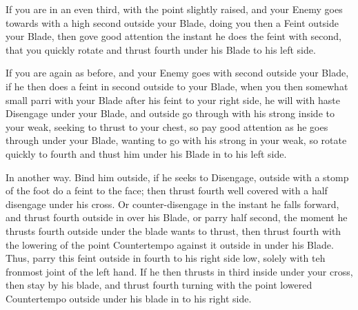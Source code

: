 If you are in an even third, with the point slightly raised, and your
Enemy goes towards with a high second outside your Blade, doing you
then a Feint outside your Blade, then gove good attention the instant
he does the feint with second, that you quickly rotate and thrust
fourth under his Blade to his left side.

\exercise{}

If you are again as before, and your Enemy goes with second outside
your Blade, if he then does a feint in second outside to your Blade,
when you then somewhat small parri with your Blade after his feint to
your right side, he will with haste Disengage under your Blade, and
outside go through with his strong inside to your weak, seeking to
thrust to your chest, so pay good attention as he goes through under
your Blade, wanting to go with his strong in your weak, so rotate
quickly to fourth and thust him under his Blade in to his left side.

\exercise{}

In another way. Bind him outside, if he seeks to Disengage, outside
with a stomp of the foot do a feint to the face; then thrust fourth
well covered with a half disengage under his cross. Or
counter-disengage in the instant he falls forward, and thrust fourth
outside in over his Blade, or parry half second, the moment he thrusts
fourth outside under the blade wants to thrust, then thrust fourth
with the lowering of the point Countertempo against it outside in
under his Blade. Thus, parry this feint outside in fourth to his right
side low, solely with teh fronmost joint of the left hand. If he then
thrusts in third inside under your cross, then stay by his blade, and
thrust fourth turning with the point lowered Countertempo outside
under his blade in to his right side.

